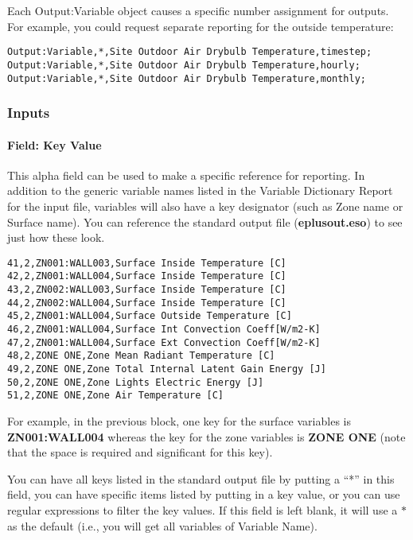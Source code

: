 Each Output:Variable object causes a specific number assignment for outputs. For example, you could request separate reporting for the outside temperature:

\begin{lstlisting}
Output:Variable,*,Site Outdoor Air Drybulb Temperature,timestep;
Output:Variable,*,Site Outdoor Air Drybulb Temperature,hourly;
Output:Variable,*,Site Outdoor Air Drybulb Temperature,monthly;
\end{lstlisting}

\subsubsection{Inputs}\label{inputs-8-019}

\paragraph{Field: Key Value}\label{field-key-value}

This alpha field can be used to make a specific reference for reporting. In addition to the generic variable names listed in the Variable Dictionary Report for the input file, variables will also have a key designator (such as Zone name or Surface name). You can reference the standard output file (\textbf{eplusout.eso}) to see just how these look.

\begin{lstlisting}
41,2,ZN001:WALL003,Surface Inside Temperature [C]
42,2,ZN001:WALL004,Surface Inside Temperature [C]
43,2,ZN002:WALL003,Surface Inside Temperature [C]
44,2,ZN002:WALL004,Surface Inside Temperature [C]
45,2,ZN001:WALL004,Surface Outside Temperature [C]
46,2,ZN001:WALL004,Surface Int Convection Coeff[W/m2-K]
47,2,ZN001:WALL004,Surface Ext Convection Coeff[W/m2-K]
48,2,ZONE ONE,Zone Mean Radiant Temperature [C]
49,2,ZONE ONE,Zone Total Internal Latent Gain Energy [J]
50,2,ZONE ONE,Zone Lights Electric Energy [J]
51,2,ZONE ONE,Zone Air Temperature [C]
\end{lstlisting}

For example, in the previous block, one key for the surface variables is \textbf{ZN001:WALL004} whereas the key for the zone variables is \textbf{ZONE ONE} (note that the space is required and significant for this key).

You can have all keys listed in the standard output file by putting a ``*'' in this field, you can have specific items listed by putting in a key value, or you can use regular expressions to filter the key values. If this field is left blank, it will use a $*$ as the default (i.e., you will get all variables of Variable Name).

